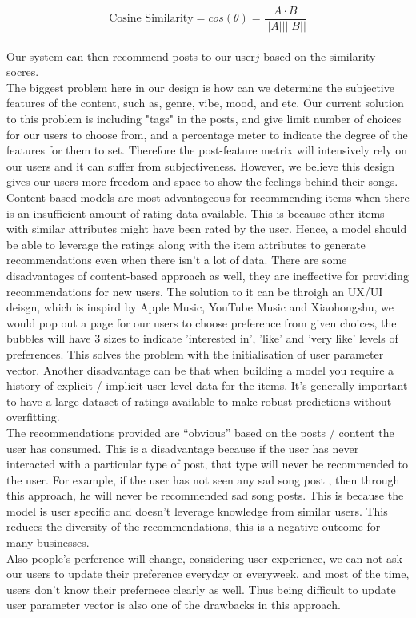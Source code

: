 \begin{equation*}
\text{Cosine Similarity} = cos(\theta) = \frac{A \cdot B}{||A|| ||B||}
\end{equation*}
\\Our system can then recommend posts to our user$j$ based on the similarity socres.
\\The biggest problem here in our design is how can we determine the subjective features of the content, such as, genre, vibe, mood, and etc. Our current solution to this problem is including "tags" in the posts, and give limit number of choices for our users to choose from, 
and a percentage meter to indicate the degree of the features for them to set. Therefore the post-feature metrix will intensively rely on our users and it can suffer from subjectiveness.
However, we believe this design gives our users more freedom and space to show the feelings behind their songs.
\\Content based models are most advantageous for recommending items when there is an insufficient amount of rating data available. This is because other items with similar attributes might have been rated by the user. Hence, a model should be able to leverage the ratings along with the item attributes to generate recommendations even when there isn’t a lot of data.
There are some disadvantages of content-based approach as well, they are ineffective for providing recommendations for new users. 
The solution to it can be throigh an UX/UI deisgn, which is inspird by Apple Music, YouTube Music and Xiaohongshu, we would pop out a page for our users to choose preference from given choices, the bubbles will have 3 sizes to indicate 'interested in', 'like' and 'very like' levels of preferences. 
This solves the problem with the initialisation of user parameter vector. 
Another disadvantage can be that when building a model you require a history of explicit / implicit user level data for the items. It’s generally important to have a large dataset of ratings available to make robust predictions without overfitting.
\\The recommendations provided are “obvious” based on the posts / content the user has consumed. This is a disadvantage because if the user has never interacted with a particular type of post, that type will never be recommended to the user. 
For example, if the user has not seen any sad song post , then through this approach, he will never be recommended sad song posts. This is because the model is user specific and doesn’t leverage knowledge from similar users. This reduces the diversity of the recommendations, this is a negative outcome for many businesses.
\\Also people's perference will change, considering user experience, we can not ask our users to update their preference everyday or everyweek, 
and most of the time, users don't know their prefernece clearly as well. Thus being difficult to update user parameter vector is also one of the drawbacks in this approach.


